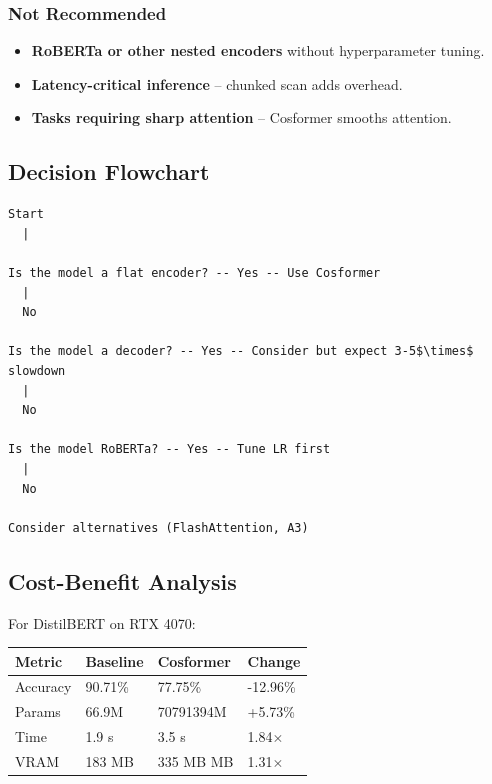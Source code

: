 \subsubsection{Not Recommended}

\begin{itemize}
\item \textbf{RoBERTa or other nested encoders} without hyperparameter tuning.
\item \textbf{Latency-critical inference} -- chunked scan adds overhead.
\item \textbf{Tasks requiring sharp attention} -- Cosformer smooths attention.

\end{itemize}
\subsection{Decision Flowchart}

\begin{lstlisting}
Start
  |
   
Is the model a flat encoder? -- Yes -- Use Cosformer
  |
  No
   
Is the model a decoder? -- Yes -- Consider but expect 3-5$\times$ slowdown
  |
  No
   
Is the model RoBERTa? -- Yes -- Tune LR first
  |
  No
   
Consider alternatives (FlashAttention, A3)
\end{lstlisting}

\subsection{Cost-Benefit Analysis}

For DistilBERT on RTX 4070:

\begin{table}[H]
\centering
\small
\begin{tabular}{llll}
\toprule
\textbf{Metric} & \textbf{Baseline} & \textbf{Cosformer} & \textbf{Change} \\
\midrule
Accuracy & 90.71\% & 77.75\% & -12.96\% \\
Params & 66.9M & 70791394M & +5.73\% \\
Time & 1.9 s & 3.5 s & 1.84$\times$ \\
VRAM & 183 MB & 335 MB MB & 1.31$\times$ \\
\bottomrule
\end{tabular}
\end{table}


